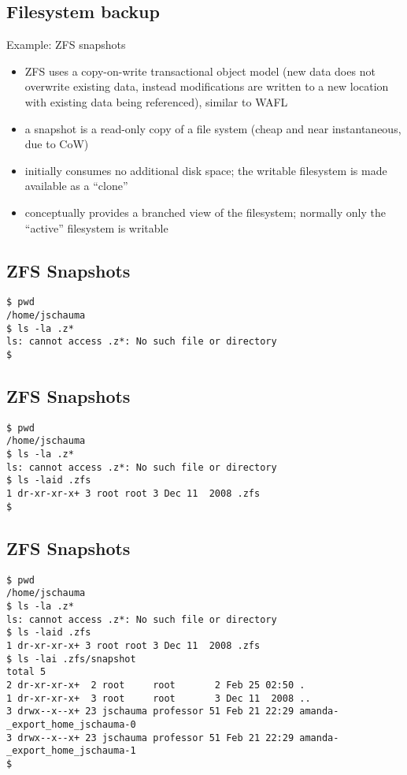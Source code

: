 \documentclass[xga]{xdvislides}
\begin{document}
\subsection{Filesystem backup}
Example: ZFS snapshots
\begin{itemize}
	\item ZFS uses a copy-on-write transactional object model (new data does
		not overwrite existing data, instead modifications are written to a
		new location with existing data being referenced), similar to WAFL
	\item a snapshot is a read-only copy of a file system (cheap and near
		instantaneous, due to CoW)
	\item initially consumes no additional disk space; the writable filesystem
		is made available as a ``clone''
	\item conceptually provides a branched view of the filesystem; normally
		only the ``active'' filesystem is writable
\end{itemize}

\subsection{ZFS Snapshots}
\newcommand{\smallish}{\fontsize{15}{20}\selectfont}
\smallish
\begin{verbatim}
$ pwd
/home/jschauma
$ ls -la .z*
ls: cannot access .z*: No such file or directory
$
\end{verbatim}
\Normalsize

\subsection{ZFS Snapshots}
\smallish
\begin{verbatim}
$ pwd
/home/jschauma
$ ls -la .z*
ls: cannot access .z*: No such file or directory
$ ls -laid .zfs
1 dr-xr-xr-x+ 3 root root 3 Dec 11  2008 .zfs
$
\end{verbatim}
\Normalsize

\subsection{ZFS Snapshots}
\smallish
\begin{verbatim}
$ pwd
/home/jschauma
$ ls -la .z*
ls: cannot access .z*: No such file or directory
$ ls -laid .zfs
1 dr-xr-xr-x+ 3 root root 3 Dec 11  2008 .zfs
$ ls -lai .zfs/snapshot
total 5
2 dr-xr-xr-x+  2 root     root       2 Feb 25 02:50 .
1 dr-xr-xr-x+  3 root     root       3 Dec 11  2008 ..
3 drwx--x--x+ 23 jschauma professor 51 Feb 21 22:29 amanda-_export_home_jschauma-0
3 drwx--x--x+ 23 jschauma professor 51 Feb 21 22:29 amanda-_export_home_jschauma-1
$
\end{verbatim}
\Normalsize
\end{document}
